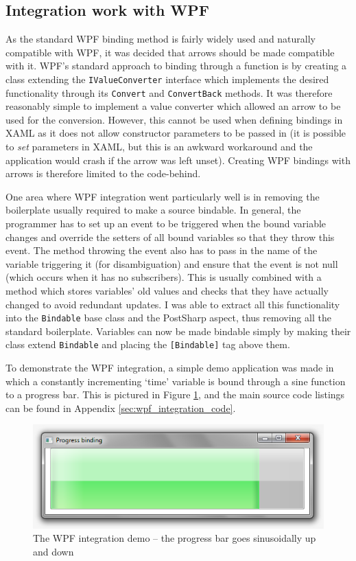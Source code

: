 \documentclass[12pt,twoside,notitlepage]{report}
\begin{document}
\subsection{Integration work with WPF}

As the standard WPF binding method is fairly widely used and naturally compatible with WPF, it was decided that arrows should be made compatible with it. WPF's standard approach to binding through a function is by creating a class extending the \texttt{IValueConverter} interface which implements the desired functionality through its \texttt{Convert} and \texttt{ConvertBack} methods. It was therefore reasonably simple to implement a value converter which allowed an arrow to be used for the conversion. However, this cannot be used when defining bindings in XAML as it does not allow constructor parameters to be passed in (it is possible to \textit{set} parameters in XAML, but this is an awkward workaround and the application would crash if the arrow was left unset). Creating WPF bindings with arrows is therefore limited to the code-behind.

One area where WPF integration went particularly well is in removing the boilerplate usually required to make a source bindable. In general, the programmer has to set up an event to be triggered when the bound variable changes and override the setters of all bound variables so that they throw this event. The method throwing the event also has to pass in the name of the variable triggering it (for disambiguation) and ensure that the event is not null (which occurs when it has no subscribers). This is usually combined with a method which stores variables' old values and checks that they have actually changed to avoid redundant updates. I was able to extract all this functionality into the \texttt{Bindable} base class and the PostSharp aspect, thus removing all the standard boilerplate. Variables can now be made bindable simply by making their class extend \texttt{Bindable} and placing the \texttt{[Bindable]} tag above them.

To demonstrate the WPF integration, a simple demo application was made in which a constantly incrementing `time' variable is bound through a sine function to a progress bar. This is pictured in Figure \ref{fig:wpf_integration_demo}, and the main source code listings can be found in Appendix \ref{sec:wpf_integration_code}.

\begin{figure}[!ht]
  \centering
  \includegraphics[width=\textwidth]{fig/WPFIntegrationDemo.png}
  \caption[WPF integration demo]{The WPF integration demo -- the progress bar goes sinusoidally up and down}
  \label{fig:wpf_integration_demo}
\end{figure}
\end{document}
